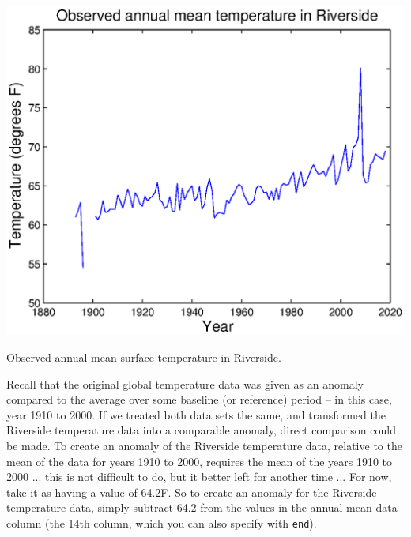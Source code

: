 \documentclass{tufte-book} %
\begin{document}
\begin{marginfigure}[-1.0in]
\includegraphics[width=\linewidth]{ch1-plot-temperature4.eps}
\caption{Observed annual mean surface temperature in Riverside.}
\label{fig:ch1-plot-temperature4}
\end{marginfigure}

Recall that the original global temperature data was given as an anomaly compared to the average over some baseline (or reference) period -- in this case, year 1910 to 2000. If we treated both data sets the same, and transformed the Riverside temperature data into a comparable anomaly, direct comparison could be made. To create an anomaly of the Riverside temperature data, relative to the mean of the data for years 1910 to 2000, requires the mean of the years 1910 to 2000 ... this is not difficult to do, but it better left for another time ... For now, take it as having a value of 64.2\degree F. So to create an anomaly for the Riverside temperature data, simply subtract 64.2 from the values in the annual mean data column (the 14th column, which you can also specify with \texttt{end}).
\end{document}
